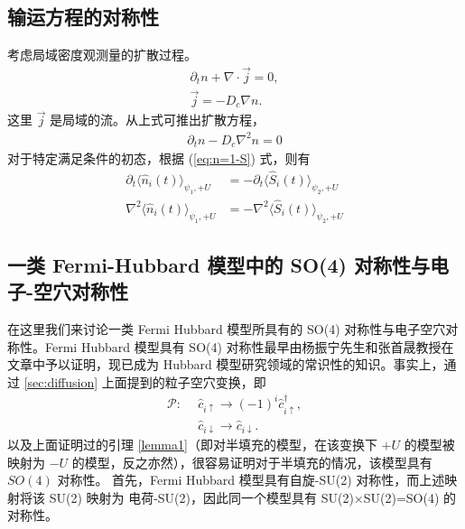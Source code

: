\subsection{输运方程的对称性}
考虑局域密度观测量的扩散过程。
\begin{align}
    \partial_tn + \nabla\cdot\vec{j} = 0, \\
    \vec{j} = -D_c\nabla n. 
\end{align}
这里 $\vec{j}$ 是局域的流。从上式可推出扩散方程，
\begin{align}
    \partial_tn-D_c\nabla^2n = 0 
\end{align}
对于特定满足条件的初态，根据 (\ref{eq:n=1-S}) 式，则有
\begin{align}
    \partial_t\langle\hat{n}_i(t)\rangle_{\psi_1, +U} &= -\partial_t\langle\hat{S}_i(t)\rangle_{\psi_2, +U} \\ 
    \nabla^2\langle\hat{n}_i(t)\rangle_{\psi_1, +U} &= -\nabla^2\langle\hat{S}_i(t)\rangle_{\psi_2, +U}
\end{align}






\subsection{一类 Fermi-Hubbard 模型中的 SO(4) 对称性与电子-空穴对称性}\label{sec:so4}

在这里我们来讨论一类 Fermi Hubbard 模型所具有的 SO(4) 对称性\cite{yang1990}与电子空穴对称性。Fermi Hubbard 模型具有 SO(4) 对称性最早由杨振宁先生和张首晟教授在  文章中予以证明，现已成为 Hubbard 模型研究领域的常识性的知识。事实上，通过 \ref{sec:diffusion} 上面提到的粒子空穴变换，即 
\begin{align}
    \mathcal{P} : \  \  
    & \hat{c}_{i\uparrow} \rightarrow (-1)^{i} \hat{c}_{i\uparrow}^{\dagger},  \nonumber\\
    & \hat{c}_{i\downarrow} \rightarrow \hat{c}_{i\downarrow}. 
\end{align}
以及上面证明过的引理 \ref{lemma1}（即对半填充的模型，在该变换下 $+U$ 的模型被映射为 $-U$ 的模型，反之亦然），很容易证明对于半填充的情况，该模型具有 $SO(4)$ 对称性。
首先，Fermi Hubbard 模型具有自旋-SU(2) 对称性，而上述映射将该 SU(2) 映射为 电荷-SU(2)，因此同一个模型具有 SU(2)$\times$SU(2)=SO(4) 的对称性。



